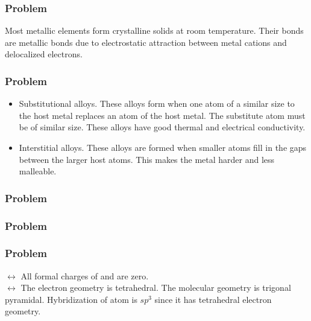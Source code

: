\documentclass[../main.tex]{subfiles}
\begin{document}
\subsubsection*{Problem \countThis}
Most metallic elements form crystalline solids at room temperature. Their bonds are metallic bonds due to electrostatic attraction between metal cations and delocalized electrons. 
\subsubsection*{Problem \countThis}
\begin{itemize}
    \item Substitutional alloys. These alloys form when one atom of a similar size to the host metal replaces an atom of the host metal. The substitute atom must be of similar size. These alloys have good thermal and electrical conductivity.
    \item Interstitial alloys. These alloys are formed when smaller atoms fill in the gaps between the larger host atoms. This makes the metal harder and less malleable. 
\end{itemize}
\subsubsection*{Problem \countThis}
\subsubsection*{Problem \countThis}
\subsubsection*{Problem \countThis}
\(\longleftrightarrow\)
\AnswerSet
All formal charges of  and  are zero. \\
\(\longleftrightarrow\)
\AnswerSet
The electron geometry is tetrahedral. The molecular geometry is trigonal pyramidal. Hybridization of  atom is \(sp^3\) since it has tetrahedral electron geometry.
\end{document}
